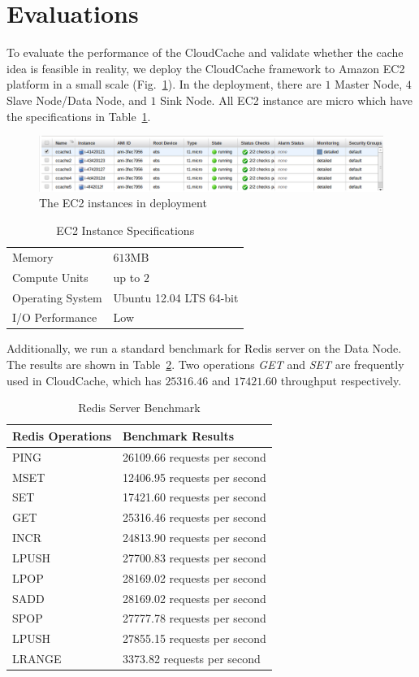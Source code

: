 \section{Evaluations} \label{sec:evaluation}
To evaluate the performance of the CloudCache and validate whether the cache idea is feasible in reality, we deploy the CloudCache framework to Amazon EC2 platform in a small scale (Fig.~\ref{fig:ec2}). In the deployment, there are $1$ Master Node, $4$ Slave Node/Data Node, and $1$ Sink Node. All EC2 instance are micro which have the specifications in Table~\ref{tab:ec2}.

\begin{figure}
\centering
\includegraphics[width=\textwidth]{pics/deployment.png}
\caption{The EC2 instances in deployment}
\label{fig:ec2}
\end{figure}

\begin{table}
\centering
\caption{EC2 Instance Specifications}
\begin{tabular}{ll}\toprule
Memory & $613$MB \\
Compute Units & up to $2$ \\
Operating System & Ubuntu 12.04 LTS 64-bit \\
I/O Performance & Low \\\bottomrule
\end{tabular}
\label{tab:ec2}
\end{table}

Additionally, we run a standard benchmark for Redis server on the Data Node. The results are shown in Table~\ref{tab:redis}. Two operations \emph{GET} and \emph{SET} are frequently used in CloudCache, which has $25316.46$ and $17421.60$ throughput respectively.

\begin{table}
\centering
\caption{Redis Server Benchmark}
\begin{tabular}{ll}\toprule
Redis Operations & Benchmark Results \\\midrule
PING & 26109.66 requests per second \\
MSET & 12406.95 requests per second \\
SET & 17421.60 requests per second \\
GET & 25316.46 requests per second \\
INCR & 24813.90 requests per second \\
LPUSH & 27700.83 requests per second \\
LPOP & 28169.02 requests per second \\
SADD & 28169.02 requests per second \\
SPOP & 27777.78 requests per second \\
LPUSH & 27855.15 requests per second \\
LRANGE & 3373.82 requests per second \\\bottomrule
\end{tabular}
\label{tab:redis}
\end{table}

